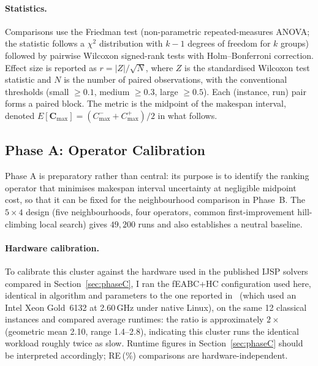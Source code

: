 \documentclass[preprint,12pt]{elsarticle}
\begin{document}
\paragraph{Statistics.} Comparisons use the Friedman test (non-parametric repeated-measures ANOVA; the statistic follows a $\chi^2$ distribution with $k-1$ degrees of freedom for $k$ groups) followed by pairwise Wilcoxon signed-rank tests with Holm--Bonferroni correction. Effect size is reported as $r = |Z| / \sqrt{N}$, where $Z$ is the standardised Wilcoxon test statistic and $N$ is the number of paired observations, with the conventional thresholds (small $\geq 0.1$, medium $\geq 0.3$, large $\geq 0.5$). Each (instance, run) pair forms a paired block. The metric is the midpoint of the makespan interval, denoted $E[\mathbf{C}_{\max}] = (C^-_{\max} + C^+_{\max})/2$ in what follows.

\subsection{Phase A: Operator Calibration}
\label{sec:phaseA}

Phase A is preparatory rather than central: its purpose is to identify the ranking operator that minimises makespan interval uncertainty at negligible midpoint cost, so that it can be fixed for the neighbourhood comparison in Phase~B. The $5 \times 4$ design (five neighbourhoods, four operators, common first-improvement hill-climbing local search) gives $49{,}200$ runs and also establishes a neutral baseline.

\paragraph{Hardware calibration.} To calibrate this cluster against the hardware used in the published IJSP solvers compared in Section~\ref{sec:phaseC}, I ran the fEABC+HC configuration used here, identical in algorithm and parameters to the one reported in~\cite{DiazFEABC2023} (which used an Intel Xeon Gold~6132 at 2.60\,GHz under native Linux), on the same 12 classical instances and compared average runtimes: the ratio is approximately $2\times$ (geometric mean 2.10, range 1.4--2.8), indicating this cluster runs the identical workload roughly twice as slow. Runtime figures in Section~\ref{sec:phaseC} should be interpreted accordingly; RE\,(\%) comparisons are hardware-independent.
\end{document}
